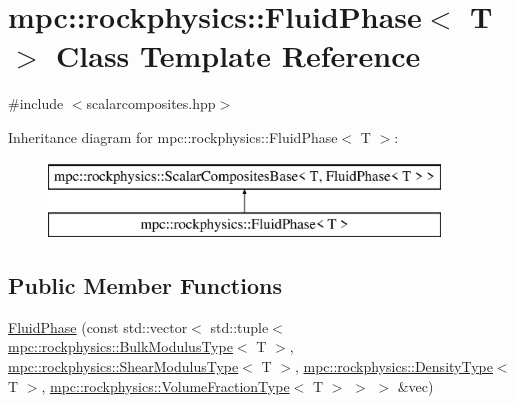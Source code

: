 \hypertarget{classmpc_1_1rockphysics_1_1_fluid_phase}{}\section{mpc\+:\+:rockphysics\+:\+:Fluid\+Phase$<$ T $>$ Class Template Reference}
\label{classmpc_1_1rockphysics_1_1_fluid_phase}


{\ttfamily \#include $<$scalarcomposites.\+hpp$>$}

Inheritance diagram for mpc\+:\+:rockphysics\+:\+:Fluid\+Phase$<$ T $>$\+:\begin{figure}[H]
\begin{center}
\leavevmode
\includegraphics[height=2.000000cm]{classmpc_1_1rockphysics_1_1_fluid_phase}
\end{center}
\end{figure}
\subsection*{Public Member Functions}
\begin{DoxyCompactItemize}
\item 
\mbox{\hyperlink{classmpc_1_1rockphysics_1_1_fluid_phase_a2705193cd79d12fd6bc9a39f0eee6898}{Fluid\+Phase}} (const std\+::vector$<$ std\+::tuple$<$ \mbox{\hyperlink{structmpc_1_1rockphysics_1_1_bulk_modulus_type}{mpc\+::rockphysics\+::\+Bulk\+Modulus\+Type}}$<$ T $>$, \mbox{\hyperlink{structmpc_1_1rockphysics_1_1_shear_modulus_type}{mpc\+::rockphysics\+::\+Shear\+Modulus\+Type}}$<$ T $>$, \mbox{\hyperlink{structmpc_1_1rockphysics_1_1_density_type}{mpc\+::rockphysics\+::\+Density\+Type}}$<$ T $>$, \mbox{\hyperlink{structmpc_1_1rockphysics_1_1_volume_fraction_type}{mpc\+::rockphysics\+::\+Volume\+Fraction\+Type}}$<$ T $>$ $>$ $>$ \&vec)
\end{DoxyCompactItemize}
